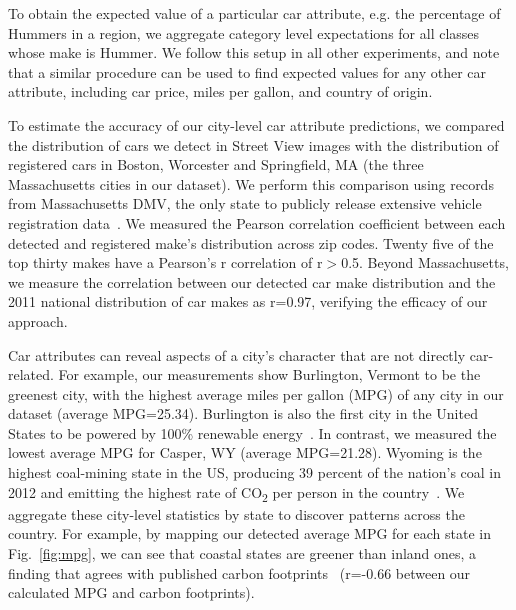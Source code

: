 \documentclass[letterpaper]{article}
\begin{document}
To obtain the expected value of a particular car attribute, e.g. the percentage of Hummers in a region, we aggregate category level expectations for all classes whose make is Hummer. We follow this setup in all other experiments, and note that a similar procedure can be used to find expected values for any other car attribute, including car price, miles per gallon, and country of origin.

To estimate the accuracy of our city-level car attribute predictions, we compared the distribution of cars we detect in Street View images with the distribution of registered cars in Boston, Worcester and Springfield, MA (the three Massachusetts cities in our dataset). We perform this comparison using records from Massachusetts DMV, the only state to publicly release extensive vehicle registration data~\cite{massgt}. We measured the Pearson correlation coefficient between each detected and registered make's distribution across zip codes. Twenty five of the top thirty makes have a Pearson's r correlation of r$>$0.5. Beyond Massachusetts, we measure the correlation between our detected car make distribution and the 2011 national distribution of car makes as r=0.97, verifying the efficacy of our approach.

Car attributes can reveal aspects of a city's character that are not directly car-related. For example, our measurements show Burlington, Vermont to be the greenest city, with the highest average miles per gallon (MPG) of any city in our dataset (average MPG=25.34). Burlington is also the first city in the United States to be powered by 100\% renewable energy~\cite{burlington}. In contrast, we measured the lowest average MPG for Casper, WY (average MPG=21.28). Wyoming is the highest coal-mining state in the US, producing 39 percent of the nation's coal in 2012 and emitting the highest rate of CO\textsubscript{2} per person in the country~\cite{wyoming_coal}. We aggregate these city-level statistics by state to discover patterns across the country. For example, by mapping our detected average MPG for each state in Fig.~\ref{fig:mpg}, we can see that coastal states are greener than inland ones, a finding that agrees with published carbon footprints~\cite{state_ranking} (r=-0.66 between our calculated MPG and carbon footprints).
\end{document}
